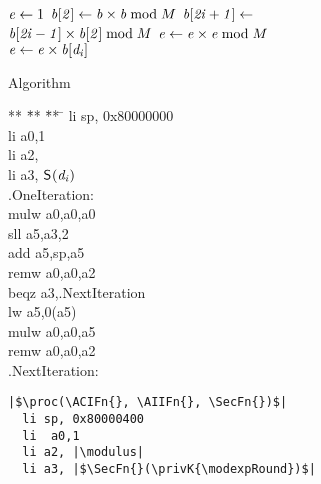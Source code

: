 \begin{figure}
\begin{subfigure}[b]{0.47\columnwidth}
\begin{algorithmic}[1]
\footnotesize{
\State $\mathit{e} \leftarrow 1$
\State $\mathit{b[{2}]} \leftarrow \mathit{b}{}\times\mathit{b}{}\bmod M$
\State $\mathit{b[{2i+1}]} \leftarrow$
\Statex \hfill$\mathit{b[{2i-1}]}\times\mathit{b[{2}]}\bmod M$
\EndFor
\fi
{} \label{line:round:start}
\State $\mathit{e}\leftarrow \mathit{e}\times\mathit{e} \bmod M$
 \label{line:beqz}
\State $\mathit{e}\leftarrow\mathit{e} \times\mathit{b[{\mathit{d_{i}}}]}$
\EndIf
\EndFor\\\label{line:round:end}
\Return \encrypted
\EndFunction
}
\end{algorithmic}
\vspace{4ex}
\caption{Algorithm \label{fig:alg:modexp}}
\end{subfigure}%
\hfill
\begin{subfigure}[b]{0.47\linewidth}
\centering
{}
\footnotesize{
\begin{tabbing}
** \= ** \= ** \= \kill
\>	li sp, 0x80000000\\
\>	li  a0,1 \\
\>	li a2, \modulus \\
\>	li a3, $\mathsf{S}_{}(\mathit{d_{i}})$\\
.OneIteration:\\
\>	mulw	a0,a0,a0\\
\>	sll	a5,a3,2\\
\>	add	a5,sp,a5\\
\>	remw	a0,a0,a2\\
\>	beqz	a3,.NextIteration\\
\>	lw	a5,0(a5)\\
\>	mulw	a0,a0,a5\\
\>	remw	a0,a0,a2\\
.NextIteration:\\
\end{tabbing}
}
\fi
\lstset{language=[riscv]Assembler,style=customriscv,escapechar=|}
\centering
\begin{lstlisting}
|$\proc(\ACIFn{}, \AIIFn{}, \SecFn{})$|
  li sp, 0x80000400    
  li  a0,1     
  li a2, |\modulus|
  li a3, |$\SecFn{}(\privK{\modexpRound})$|   

\end{lstlisting}
\end{subfigure}
\end{figure}
